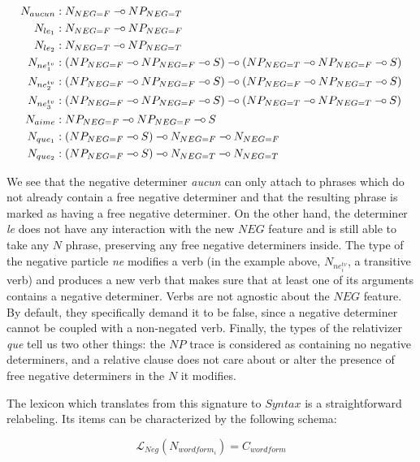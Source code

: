 \documentclass{llncs}
\def\limp {\mathbin{{-}\mkern-3.5mu{\circ}}}
\begin{document}
\begin{align*}
N_{aucun} &: N_{NEG{=}F} \limp NP_{NEG{=}T} \\
N_{le_1} &: N_{NEG{=}F} \limp NP_{NEG{=}F} \\
N_{le_2} &: N_{NEG{=}T} \limp NP_{NEG{=}T} \\
N_{ne^{tv}_1} &: (NP_{NEG{=}F} \limp NP_{NEG{=}F} \limp S) \limp (NP_{NEG{=}T} \limp NP_{NEG{=}F} \limp S) \\
N_{ne^{tv}_2} &: (NP_{NEG{=}F} \limp NP_{NEG{=}F} \limp S) \limp (NP_{NEG{=}F}
\limp NP_{NEG{=}T} \limp S) \\
N_{ne^{tv}_3} &: (NP_{NEG{=}F} \limp NP_{NEG{=}F} \limp S) \limp (NP_{NEG{=}T}
\limp NP_{NEG{=}T} \limp S) \\
N_{aime} &: NP_{NEG{=}F} \limp NP_{NEG{=}F} \limp S \\
N_{que_1} &: (NP_{NEG{=}F} \limp S) \limp N_{NEG{=}F} \limp N_{NEG{=}F} \\
N_{que_2} &: (NP_{NEG{=}F} \limp S) \limp N_{NEG{=}T} \limp N_{NEG{=}T} \\
\end{align*}

\vspace{-3ex}

We see that the negative determiner \emph{aucun} can only attach to phrases
which do not already contain a free negative determiner and that the resulting
phrase is marked as having a free negative determiner. On the other hand, the
determiner \emph{le} does not have any interaction with the new $NEG$ feature
and is still able to take any $N$ phrase, preserving any free negative
determiners inside. The type of the negative particle \emph{ne} modifies a
verb (in the example above, $N_{ne^{tv}_i}$, a transitive verb) and produces a
new verb that makes sure that at least one of its arguments contains a
negative determiner. Verbs are not agnostic about the $NEG$ feature. By
default, they specifically demand it to be false, since a negative determiner
cannot be coupled with a non-negated verb. Finally, the types of the
relativizer \emph{que} tell us two other things: the $NP$ trace is considered
as containing no negative determiners, and a relative clause does not care
about or alter the presence of free negative determiners in the $N$ it
modifies.

The lexicon which translates from this signature to $Syntax$ is a
straightforward relabeling. Its items can be characterized by the following
schema:

$$
\mathcal{L}_{Neg}(N_{wordform_{i}}) = C_{wordform}
$$
\end{document}
